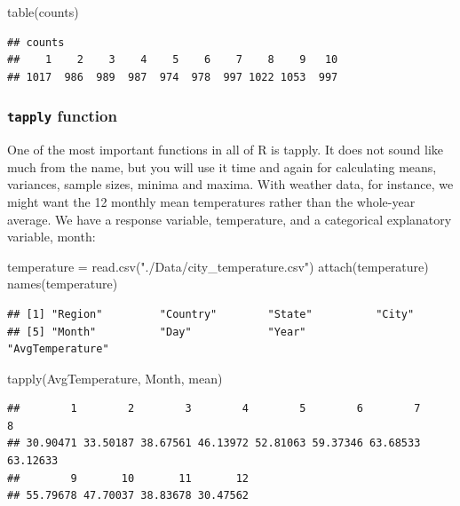 \documentclass[
]{book}
\newenvironment{Shaded}{\begin{snugshade}}{\end{snugshade}}
\newcommand{\FunctionTok}[1]{\textcolor[rgb]{0.00,0.00,0.00}{#1}}
\newcommand{\NormalTok}[1]{#1}
\newcommand{\OtherTok}[1]{\textcolor[rgb]{0.56,0.35,0.01}{#1}}
\newcommand{\StringTok}[1]{\textcolor[rgb]{0.31,0.60,0.02}{#1}}
\begin{document}
\begin{Shaded}
\begin{Highlighting}[]
\FunctionTok{table}\NormalTok{(counts)}
\end{Highlighting}
\end{Shaded}

\begin{verbatim}
## counts
##    1    2    3    4    5    6    7    8    9   10 
## 1017  986  989  987  974  978  997 1022 1053  997
\end{verbatim}

\hypertarget{tapply-function}{%
\subsubsection{\texorpdfstring{\texttt{tapply} function}{tapply function}}\label{tapply-function}}

One of the most important functions in all of R is tapply. It does not sound like much from the name, but you will use it time and again for calculating means, variances, sample sizes, minima and maxima. With weather data, for instance, we might want the 12 monthly mean temperatures rather than the whole-year average. We have a response variable, temperature, and a categorical explanatory variable, month:

\begin{Shaded}
\begin{Highlighting}[]
\NormalTok{temperature }\OtherTok{=} \FunctionTok{read.csv}\NormalTok{(}\StringTok{"./Data/city\_temperature.csv"}\NormalTok{)}
\FunctionTok{attach}\NormalTok{(temperature)}
\FunctionTok{names}\NormalTok{(temperature)}
\end{Highlighting}
\end{Shaded}

\begin{verbatim}
## [1] "Region"         "Country"        "State"          "City"          
## [5] "Month"          "Day"            "Year"           "AvgTemperature"
\end{verbatim}

\begin{Shaded}
\begin{Highlighting}[]
\FunctionTok{tapply}\NormalTok{(AvgTemperature, Month, mean)}
\end{Highlighting}
\end{Shaded}

\begin{verbatim}
##        1        2        3        4        5        6        7        8 
## 30.90471 33.50187 38.67561 46.13972 52.81063 59.37346 63.68533 63.12633 
##        9       10       11       12 
## 55.79678 47.70037 38.83678 30.47562
\end{verbatim}
\end{document}
